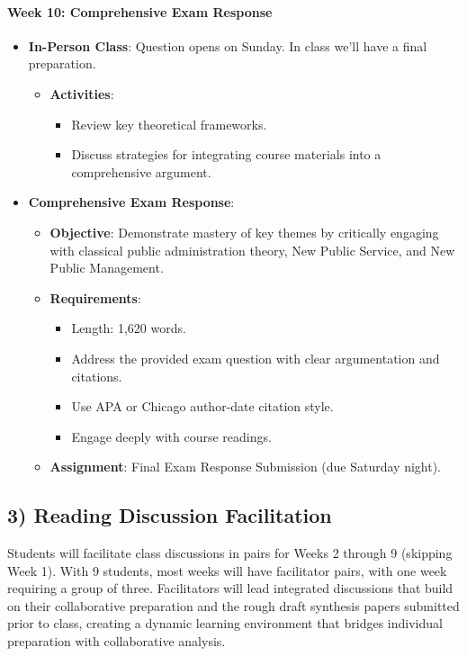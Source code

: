 \documentclass[12pt, letterpaper]{article}
\begin{document}
\paragraph{Week 10: Comprehensive Exam Response}
\begin{itemize}
    \item \textbf{In-Person Class}: Question opens on Sunday. In class we'll have a final preparation.
    \begin{itemize}
        \item \textbf{Activities}:
        \begin{itemize}
            \item Review key theoretical frameworks.
            \item Discuss strategies for integrating course materials into a comprehensive argument.
        \end{itemize}
    \end{itemize}
    \item \textbf{Comprehensive Exam Response}:
    \begin{itemize}
        \item \textbf{Objective}: Demonstrate mastery of key themes by critically engaging with classical public administration theory, New Public Service, and New Public Management.
        \item \textbf{Requirements}:
        \begin{itemize}
            \item Length: 1,620 words.
            \item Address the provided exam question with clear argumentation and citations.
            \item Use APA or Chicago author-date citation style.
            \item Engage deeply with course readings.
        \end{itemize}
        \item \textbf{Assignment}: Final Exam Response Submission (due Saturday night).
    \end{itemize}
\end{itemize}

\subsection*{3) Reading Discussion Facilitation}

Students will facilitate class discussions in pairs for Weeks 2 through 9 (skipping Week 1). With 9 students, most weeks will have facilitator pairs, with one week requiring a group of three. Facilitators will lead integrated discussions that build on their collaborative preparation and the rough draft synthesis papers submitted prior to class, creating a dynamic learning environment that bridges individual preparation with collaborative analysis.
\end{document}
